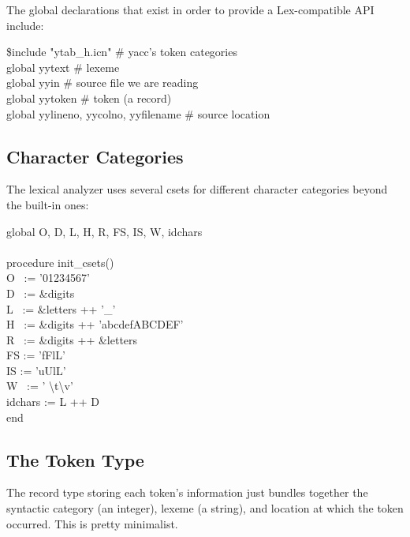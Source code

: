 The global declarations that exist in order to provide a
Lex-compatible API include:

\begin{iconcode}
\$include "ytab\_h.icn" \> \> \> \> \> \> \> \> \> \> \> \# yacc's token categories \\
global yytext \> \> \> \> \> \> \> \> \> \> \> \# lexeme \\
global yyin \> \> \> \> \> \> \> \> \> \> \> \# source file we are reading \\
global yytoken \> \> \> \> \> \> \> \> \> \> \> \# token (a record) \\
global yylineno, yycolno, yyfilename \> \> \> \> \> \> \> \> \> \> \> \# source location
\end{iconcode}

\subsection{Character Categories}

The lexical analyzer uses several csets for different character
categories beyond the built-in ones:

\begin{iconcode}
global O, D, L, H, R, FS, IS, W, idchars\\
\ \\
procedure init\_csets() \\
\>   O \ := '01234567' \\
\>   D \ := \&digits \\
\>   L \ := \&letters ++ '\_' \\
\>   H \ := \&digits ++ 'abcdefABCDEF' \\
\>   R \ := \&digits ++ \&letters \\
\>   FS := 'fFlL' \\
\>   IS := 'uUlL' \\
\>   W \ := ' {\textbackslash}t{\textbackslash}v' \\
\>   idchars := L ++ D \\
end
\end{iconcode}

\subsection{The Token Type}

The record type storing each token's information just bundles together
the syntactic category (an integer), lexeme (a string), and location
at which the token occurred. This is pretty minimalist.

